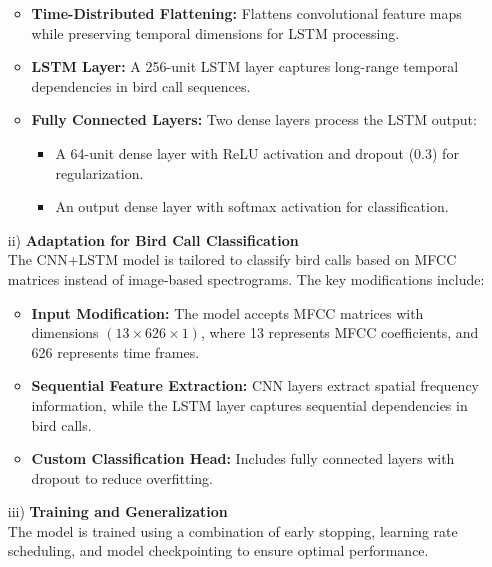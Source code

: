 \begin{itemize}
\begin{itemize}
            \item \textbf{Time-Distributed Flattening:} Flattens convolutional feature maps while preserving temporal dimensions for LSTM processing.
            
            \item \textbf{LSTM Layer:} A 256-unit LSTM layer captures long-range temporal dependencies in bird call sequences.
            
            \item \textbf{Fully Connected Layers:} Two dense layers process the LSTM output:
            \begin{itemize}
                  \item A 64-unit dense layer with ReLU activation and dropout (0.3) for regularization.
                  \item An output dense layer with softmax activation for classification.
            \end{itemize}
            \end{itemize}

            \item[ii)] \textbf{Adaptation for Bird Call Classification} \\
            The CNN+LSTM model is tailored to classify bird calls based on MFCC matrices instead of image-based spectrograms. The key modifications include:

            \begin{itemize}
            \item \textbf{Input Modification:} The model accepts MFCC matrices with dimensions $(13 \times 626 \times 1)$, where 13 represents MFCC coefficients, and 626 represents time frames.
            \item \textbf{Sequential Feature Extraction:} CNN layers extract spatial frequency information, while the LSTM layer captures sequential dependencies in bird calls.
            \item \textbf{Custom Classification Head:} Includes fully connected layers with dropout to reduce overfitting.
            \end{itemize}

            \item[iii)] \textbf{Training and Generalization} \\
            The model is trained using a combination of early stopping, learning rate scheduling, and model checkpointing to ensure optimal performance.


\end{itemize}
